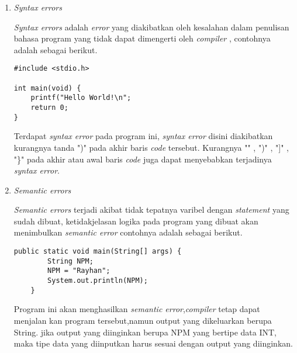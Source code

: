 \begin{enumerate}
\item 
\textit{Syntax errors}
\par 
\textit{Syntax errors} adalah \textit{error} yang diakibatkan oleh kesalahan dalam penulisan bahasa program yang tidak dapat dimengerti oleh \textit{compiler} , contohnya adalah sebagai berikut.

\begin{verbatim}
#include <stdio.h>

int main(void) {
    printf("Hello World!\n";
    return 0;
}
\end{verbatim}
 
Terdapat \textit{syntax error} pada program ini, \textit{syntax error} disini diakibatkan kurangnya tanda ")" pada akhir baris \textit{code} tersebut. Kurangnya "\;" , ")" , "]" , "\}" pada akhir atau awal baris \textit{code} juga dapat menyebabkan terjadinya \textit{syntax error}.

\item 
\textit{Semantic errors}
\par 
\textit{Semantic errors} terjadi akibat tidak tepatnya varibel dengan \textit{statement} yang sudah dibuat, ketidakjelasan logika pada program yang dibuat akan menimbulkan \textit{semantic error} contohnya adalah sebagai berikut.

\begin{verbatim}
public static void main(String[] args) {	
		String NPM;		
		NPM = "Rayhan";
		System.out.println(NPM);
	}
\end{verbatim}
\par 
Program ini akan menghasilkan \textit{semantic error},\textit{compiler} tetap dapat menjalan kan program tersebut,namun output yang dikeluarkan berupa String. jika output yang diinginkan berupa NPM yang bertipe data INT, maka tipe data yang diinputkan harus sesuai dengan output yang diinginkan.
\end{enumerate}